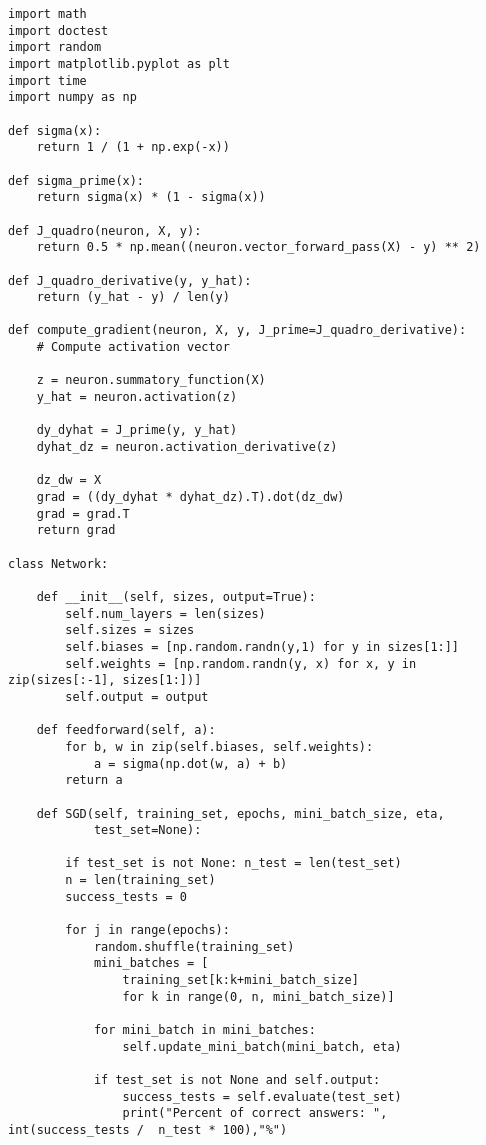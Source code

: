 \newpage


\begin{lstlisting}
import math
import doctest
import random
import matplotlib.pyplot as plt
import time
import numpy as np

def sigma(x):
    return 1 / (1 + np.exp(-x))

def sigma_prime(x):
    return sigma(x) * (1 - sigma(x))

def J_quadro(neuron, X, y):
    return 0.5 * np.mean((neuron.vector_forward_pass(X) - y) ** 2)

def J_quadro_derivative(y, y_hat):
    return (y_hat - y) / len(y)

def compute_gradient(neuron, X, y, J_prime=J_quadro_derivative):
    # Compute activation vector

    z = neuron.summatory_function(X)
    y_hat = neuron.activation(z)

    dy_dyhat = J_prime(y, y_hat)
    dyhat_dz = neuron.activation_derivative(z)

    dz_dw = X
    grad = ((dy_dyhat * dyhat_dz).T).dot(dz_dw)
    grad = grad.T
    return grad

class Network:

    def __init__(self, sizes, output=True):
        self.num_layers = len(sizes)
        self.sizes = sizes
        self.biases = [np.random.randn(y,1) for y in sizes[1:]]
        self.weights = [np.random.randn(y, x) for x, y in zip(sizes[:-1], sizes[1:])]
        self.output = output
        
    def feedforward(self, a):
        for b, w in zip(self.biases, self.weights):
            a = sigma(np.dot(w, a) + b)
        return a
    
    def SGD(self, training_set, epochs, mini_batch_size, eta,
            test_set=None):
        
        if test_set is not None: n_test = len(test_set)
        n = len(training_set)
        success_tests = 0

        for j in range(epochs):
            random.shuffle(training_set)
            mini_batches = [
                training_set[k:k+mini_batch_size]
                for k in range(0, n, mini_batch_size)]

            for mini_batch in mini_batches:
                self.update_mini_batch(mini_batch, eta)

            if test_set is not None and self.output:
                success_tests = self.evaluate(test_set)
                print("Percent of correct answers: ", int(success_tests /  n_test * 100),"%")


\end{lstlisting}
